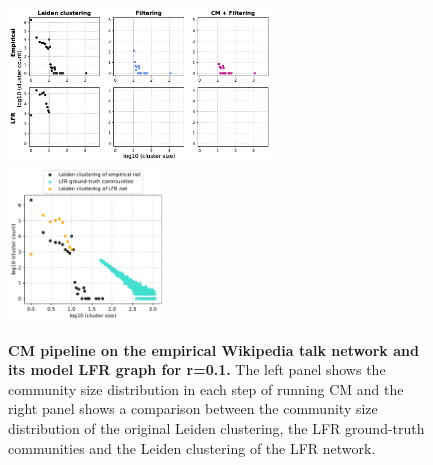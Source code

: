 \documentclass[a4paper]{article}   	%
\begin{document}
\begin{figure}[h!]
\centering
\includegraphics[width=0.62\textwidth]{figs/wiki_talk_cm_steps_lfr1.pdf}
\includegraphics[width=0.37\textwidth]{figs/wiki_talk_1_cm_size.pdf}
\caption[CM pipeline on the Wikipedia talk network and its model LFR graph for r=0.1]{\textbf{CM pipeline on the empirical Wikipedia talk network and its model LFR graph for r=0.1.} The left panel shows the community size distribution in each step of running CM and the right panel shows a comparison between the community size distribution of the original Leiden clustering, the LFR ground-truth communities and the Leiden clustering of the LFR network.}
\label{fig:wikitalk-cm-lfr-1}
\end{figure}
\end{document}
